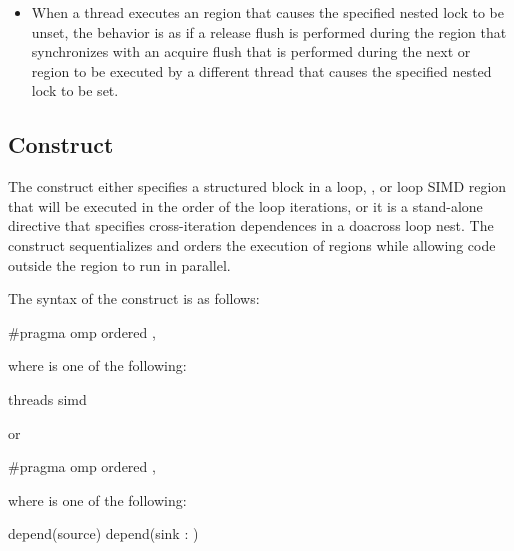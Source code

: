 \begin{itemize}
    \item When a thread executes an  region that causes
	the specified nested lock to be unset, the behavior is as if a release flush
        is performed during the  region that
        synchronizes with an acquire flush that is performed during the next
         or  region to be
        executed by a different thread that causes the specified nested lock
        to be set.  
\end{itemize}





\subsection{ Construct}
\label{subsec:ordered Construct}
\summary
The  construct either specifies a structured block in a loop,
, or loop SIMD region that will be executed in the order of the
loop iterations, or it is a stand-alone directive that specifies
cross-iteration dependences in a doacross loop nest. The 
construct sequentializes and orders the execution of  regions
while allowing code outside the region to run in parallel.

\begin{samepage}
\syntax
\begin{ccppspecific}
The syntax of the  construct is as follows:

\begin{ompcPragma}
#pragma omp ordered \plc{[clause[ [},\plc{] clause] ]} 
\end{ompcPragma}

where  is one of the following:
\begin{indentedcodelist}
threads
simd
\end{indentedcodelist}

or

\begin{ompcPragma}
#pragma omp ordered \plc{clause [[[},\plc{] clause] ... ]} 
\end{ompcPragma}
where  is one of the following:
\begin{indentedcodelist}
depend(source)
depend(sink : )
\end{indentedcodelist}


\end{ccppspecific}
\end{samepage}


